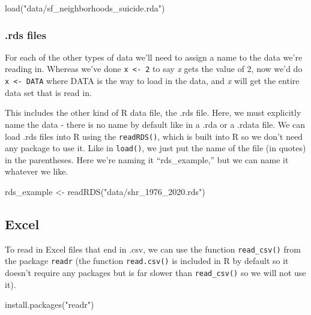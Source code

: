 \documentclass[
]{krantz}
\makeatletter
\newenvironment{Shaded}{\begin{snugshade}}{\end{snugshade}}
\newcommand{\FunctionTok}[1]{\textcolor[rgb]{0,0,0}{#1}}
\newcommand{\NormalTok}[1]{#1}
\newcommand{\OtherTok}[1]{\textcolor[rgb]{0.37,0.37,0.37}{#1}}
\newcommand{\StringTok}[1]{\textcolor[rgb]{0.5,0.5,0.5}{#1}}
\newenvironment{kframe}{%
\medskip{}
\setlength{\fboxsep}{.8em}
 \def\at@end@of@kframe{}%
 \ifinner\ifhmode%
  \def\at@end@of@kframe{\end{minipage}}%
  \begin{minipage}{\columnwidth}%
 \fi\fi%
 \def\FrameCommand##1{\hskip\@totalleftmargin \hskip-\fboxsep
 \colorbox{shadecolor}{##1}\hskip-\fboxsep
     \hskip-\linewidth \hskip-\@totalleftmargin \hskip\columnwidth}%
 \MakeFramed {\advance\hsize-\width
   \@totalleftmargin\z@ \linewidth\hsize
   \@setminipage}}%
 {\par\unskip\endMakeFramed%
 \at@end@of@kframe}
\renewenvironment{Shaded}{\begin{kframe}}{\end{kframe}}
\makeatother
\begin{document}
\begin{Shaded}
\begin{Highlighting}[]
\FunctionTok{load}\NormalTok{(}\StringTok{"data/sf\_neighborhoods\_suicide.rda"}\NormalTok{)}
\end{Highlighting}
\end{Shaded}

\hypertarget{rds-files}{%
\subsubsection{.rds files}\label{rds-files}}

For each of the other types of data we'll need to assign a
name to the data we're reading in. Whereas we've done
\texttt{x\ \textless{}-\ 2} to say \emph{x} gets the value
of 2, now we'd do \texttt{x\ \textless{}-\ DATA} where DATA
is the way to load in the data, and \emph{x} will get the
entire data set that is read in.

This includes the other kind of R data file, the .rds file.
Here, we must explicitly name the data - there is no name by
default like in a .rda or a .rdata file. We can load .rds
files into R using the \texttt{readRDS()}, which is built
into R so we don't need any package to use it. Like in
\texttt{load()}, we just put the name of the file (in
quotes) in the parentheses. Here we're naming it
``rds\_example,'' but we can name it whatever we like.

\begin{Shaded}
\begin{Highlighting}[]
\NormalTok{rds\_example }\OtherTok{\textless{}{-}} \FunctionTok{readRDS}\NormalTok{(}\StringTok{"data/shr\_1976\_2020.rds"}\NormalTok{)}
\end{Highlighting}
\end{Shaded}

\hypertarget{excel}{%
\subsection{Excel}\label{excel}}

To read in Excel files that end in .csv, we can use the
function \texttt{read\_csv()} from the package
\texttt{readr} (the function \texttt{read.csv()} is included
in R by default so it doesn't require any packages but is
far slower than \texttt{read\_csv()} so we will not use it).

\begin{Shaded}
\begin{Highlighting}[]
\FunctionTok{install.packages}\NormalTok{(}\StringTok{"readr"}\NormalTok{)}
\end{Highlighting}
\end{Shaded}
\end{document}
